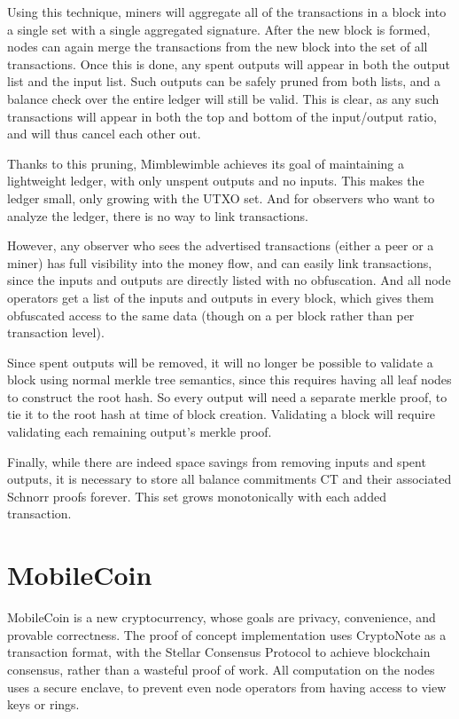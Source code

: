 \documentclass{article}
\begin{document}
Using this technique, miners will aggregate all of the transactions in a block into a single set with a single aggregated signature.  After the new block is formed, nodes can again merge the transactions from the new block into the set of all transactions.  Once this is done, any spent outputs will appear in both the output list and the input list.  Such outputs can be safely pruned from both lists, and a balance check over the entire ledger will still be valid.  This is clear, as any such transactions will appear in both the top and bottom of the input/output ratio, and will thus cancel each other out.  

Thanks to this pruning, Mimblewimble achieves its goal of maintaining a lightweight ledger, with only unspent outputs and no inputs.  This makes the ledger small, only growing with the UTXO set.  And for observers who want to analyze the ledger, there is no way to link transactions.

However, any observer who sees the advertised transactions (either a peer or a miner) has full visibility into the money flow, and can easily link transactions, since the inputs and outputs are directly listed with no obfuscation.  And all node operators get a list of the inputs and outputs in every block, which gives them obfuscated access to the same data (though on a per block rather than per transaction level).

Since spent outputs will be removed, it will no longer be possible to validate a block using normal merkle tree semantics, since this requires having all leaf nodes to construct the root hash.  So every output will need a separate merkle proof, to tie it to the root hash at time of block creation.  Validating a block will require validating each remaining output’s merkle proof.

Finally, while there are indeed space savings from removing inputs and spent outputs, it is necessary to store all balance commitments CT and their associated Schnorr proofs forever.  This set grows monotonically with each added transaction.  



\section{MobileCoin}

MobileCoin is a new cryptocurrency, whose goals are privacy, convenience, and provable correctness.  The proof of concept implementation uses CryptoNote as a transaction format, with the Stellar Consensus Protocol to achieve blockchain consensus, rather than a wasteful proof of work.  All computation on the nodes uses a secure enclave, to prevent even node operators from having access to view keys or rings.  
\end{document}
